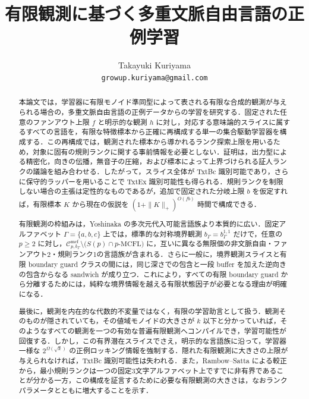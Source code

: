 \documentclass[11pt,a4paper]{ltjsarticle}
\title{有限観測に基づく多重文脈自由言語の正例学習}
\author{Takayuki Kuriyama\\\texttt{growup.kuriyama@gmail.com}}
\date{}
\numberwithin{equation}{section}
\theoremstyle{plain}
\theoremstyle{definition}
\theoremstyle{remark}
\newcommand{\Cmcf}[2]{\mathcal{C}^{\mathrm{mcf}}_{#1,#2}}
\begin{document}
\setlength{\abovedisplayskip}{6pt plus 2pt minus 3pt}
\setlength{\belowdisplayskip}{6pt plus 2pt minus 3pt}
\setlength{\abovedisplayshortskip}{3pt plus 1pt minus 2pt}
\setlength{\belowdisplayshortskip}{3pt plus 1pt minus 2pt}
\maketitle

\begin{abstract}
本論文では，学習器に有限モノイド準同型によって表される有限な合成的観測が与えられる場合の，多重文脈自由言語の正例データからの学習を研究する．固定された任意のファンアウト上限 $f$ と明示的な観測 $h$ に対し，対応する意味論的スライスに属するすべての言語を，有限な特徴標本から正確に再構成する単一の集合駆動学習器を構成する．この再構成では，観測された標本から導かれるランク探索上限を用いるため，対象に固有の規則ランクに関する事前情報を必要としない．証明は，出力型による精密化，向きの伝播，無音子の圧縮，および標本によって上界づけられる証人ランクの議論を組み合わせる．したがって，スライス全体が TxtBc 識別可能であり，さらに保守的ラッパーを用いることで TxtEx 識別可能性も得られる．規則ランクを制限しない場合の主張は定性的なものであるが，追加で固定された分岐上限 $b$ を仮定すれば，有限標本 $K$ から現在の仮説を $(1+\|K\|_+)^{O(fb)}$ 時間で構成できる．

有限観測の枠組みは，Yoshinaka の多次元代入可能言語族より本質的に広い．固定アルファベット $\Gamma=\{a,b,c\}$ 上では，標準的な対称境界観測 $b_\Gamma=b_\Gamma^{1,1}$ だけで，任意の $p\ge2$ に対し，$\Cmcf{p}{b_\Gamma}\setminus\bigl(S(p)\cap p\text{-}\mathrm{MCFL}\bigr)$ に，互いに異なる無限個の非文脈自由・ファンアウト2・規則ランク1の言語族が含まれる．さらに一般に，境界観測スライスと有限 boundary guard クラスの間には，同じ深さでの包含と一段 buffer を加えた逆向きの包含からなる sandwich が成り立つ．これにより，すべての有限 boundary guard から分離するためには，純粋な境界情報を越える有限状態因子が必要となる理由が明確になる．

最後に，観測を内在的な代数的不変量ではなく，有限の学習助言として扱う．観測そのものが隠されていても，その値域モノイドの大きさが $k$ 以下と分かっていれば，そのようなすべての観測を一つの有効な普遍有限観測へコンパイルでき，学習可能性が回復する．しかし，この有界潜在スライスでさえ，明示的な言語族に沿って，学習器一様な $2^{\Omega(\sqrt{k})}$ の正例ロッキング情報を強制する．隠れた有限観測に大きさの上限が与えられなければ，TxtBc 識別可能性は失われる．また，Rambow--Satta による較正から，最小規則ランクは一つの固定3文字アルファベット上ですでに非有界であることが分かる一方，この構成を証言するために必要な有限観測の大きさは，なおランクパラメータとともに増大することを示す．
\end{abstract}
\end{document}
